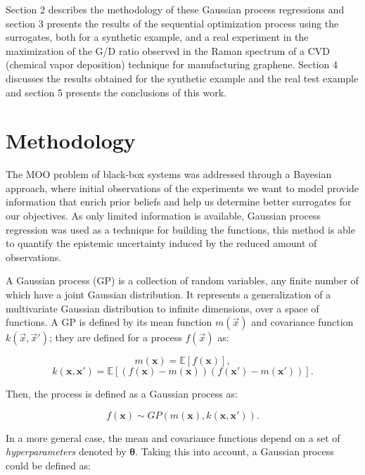 \documentclass{article}
\begin{document}
Section 2 describes the methodology of these Gaussian process regressions and section 3 presents the results of the sequential optimization process using the surrogates, both for a synthetic example, and a real experiment in the maximization of the G/D ratio observed in the Raman spectrum of a CVD (chemical vapor deposition) technique for manufacturing graphene. Section 4 discusses the results obtained for the synthetic example and the real test example and section 5 presents the conclusions of this work.

\section{Methodology}

The MOO problem of black-box systems was addressed through a Bayesian approach, where initial observations of the experiments we want to model provide information that enrich prior beliefs and help us determine better surrogates for our objectives. As only limited information is available, Gaussian process regression was used as a technique for building the functions, this method is able to quantify the epistemic uncertainty induced by the reduced amount of observations.

A Gaussian process (GP) is a collection of random variables, any finite number of which have a joint Gaussian distribution\cite{Seeger2004}. It represents a generalization of a multivariate Gaussian distribution to infinite dimensions, over a space of functions. A GP is defined by its mean function $m(\vec{x})$ and covariance function $k(\vec{x},\vec{x}')$; they are defined for a process $f(\vec{x})$ as:

\begin{equation}
    m(\textbf{x}) = \mathbb{E}[f(\textbf{x})],
\end{equation}
\begin{equation}
    k(\textbf{x},\textbf{x}') = \mathbb{E}[(f(\textbf{x})-m(\textbf{x}))(f(\textbf{x}')-m(\textbf{x}'))].
\end{equation}

Then, the process is defined as a Gaussian process as: \cite{Seeger2004}

\begin{equation}
    f(\textbf{x}) \sim GP(m(\textbf{x}), k(\textbf{x},\textbf{x}')).
\end{equation}

In a more general case, the mean and covariance functions depend on a set of \textit{hyperparameters} denoted by $\boldsymbol \theta$. Taking this into account, a Gaussian process could be defined as:
\end{document}
